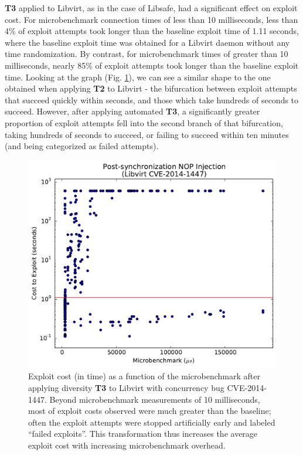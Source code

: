 \textbf{T3} applied to Libvirt, as in the case of Libsafe, had a significant effect on exploit cost.
For microbenchmark connection times of less than 10 milliseconds, less than 4\% of exploit attempts took longer than the baseline exploit time of 1.11 seconds, where the baseline exploit time was obtained for a Libvirt daemon without any time randomization.
By contrast, for microbenchmark times of greater than 10 milliseconds, nearly 85\% of exploit attempts took longer than the baseline exploit time.
Looking at the graph (Fig. \ref{fig_libvirt-post}), we can see a similar shape to the one obtained when applying \textbf{T2} to Libvirt - the bifurcation between exploit attempts that succeed quickly within seconds, and those which take hundreds of seconds to succeed.
However, after applying automated \textbf{T3}, a significantly greater proportion of exploit attempts fell into the second branch of that bifurcation, taking hundreds of seconds to succeed, or failing to succeed within ten minutes (and being categorized as failed attempts).
\begin{figure}
	\centering
	\includegraphics[width=.75\columnwidth]{figures/libvirt-post}
	\caption{
		Exploit cost (in time) as a function of the microbenchmark after applying diversity \textbf{T3} to Libvirt with concurrency bug CVE-2014-1447.
		Beyond microbenchmark measurements of 10 milliseconds, most of exploit costs observed were much greater than the baseline; often the exploit attempts were stopped artificially early and labeled ``failed exploits''.
		This transformation thus increases the average exploit cost with increasing microbenchmark overhead.
	}
	\label{fig_libvirt-post}
\end{figure}